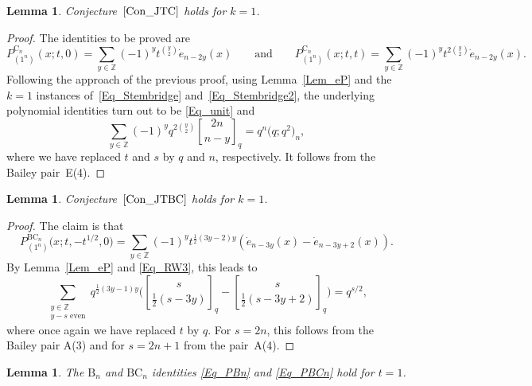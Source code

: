 \documentclass[pdftex]{sigma}
\numberwithin{equation}{section}
\newtheorem{Lemma}[Theorem]{Lemma}
\newcommand{\qbin}[2]{\genfrac{[}{]}{0pt}{}{#1}{#2}}
\begin{document}
\begin{Lemma}\label{Lem_kis1b}
Conjecture~$\ref{Con_JTC}$ holds for $k=1$.
\end{Lemma}

\begin{proof}
The identities to be proved are
\[
P_{(1^n)}^{\mathrm{C}_n}(x;t,0)
=\sum_{y\in\mathbb{Z}}(-1)^y t^{\binom{y}{2}}
\dot{e}_{n-2y}(x)
\qquad\text{and}\qquad
P_{(1^n)}^{\mathrm{C}_n}(x;t,t)
=\sum_{y\in\mathbb{Z}}
(-1)^y t^{2\binom{y}{2}} \dot{e}_{n-2y}(x).
\]
Following the approach of the previous proof, using Lemma~\ref{Lem_eP}
and the $k=1$ instances of~\eqref{Eq_Stembridge} and~\eqref{Eq_Stembridge2},
the underlying polynomial identities turn out
to be \eqref{Eq_unit} and
\[
\sum_{y\in\mathbb{Z}}(-1)^y q^{2\binom{y}{2}} \qbin{2n}{n-y}_q
=q^n \bigl(q;q^2\bigr)_n,
\]
where we have replaced $t$ and $s$ by $q$ and $n$, respectively.
It follows from the Bailey pair~E(4).
\end{proof}

\begin{Lemma}\label{Lem_kis1c}
Conjecture~$\ref{Con_JTBC}$ holds for $k=1$.
\end{Lemma}

\begin{proof}
The claim is that
\[
P_{(1^n)}^{\mathrm{BC}_n}\bigl(x;t,-t^{1/2},0\bigr)
=\sum_{y\in\mathbb{Z}}
(-1)^y t^{\frac{1}{2}(3y-2)y}
 (\dot{e}_{n-3y}(x)-\dot{e}_{n-3y+2}(x) ).
\]
By Lemma~\ref{Lem_eP} and \eqref{Eq_RW3},
this leads to
\[
\sum_{\substack{y\in\mathbb{Z}\\[1pt] y-s \text{ even}}}
q^{\frac{1}{2}(3y-1)y} \biggl( \qbin{s}{\frac{1}{2}(s-3y)}_q
-\qbin{s}{\frac{1}{2}(s-3y+2)}_q \biggr)=q^{s/2},
\]
where once again we have replaced $t$ by $q$.
For $s=2n$, this follows from the Bailey pair A(3) and for $s=2n+1$
from the pair~A(4).
\end{proof}


\begin{Lemma}%
The $\mathrm{B}_n$ and $\mathrm{BC}_n$ identities \eqref{Eq_PBn}
and \eqref{Eq_PBCn} hold for $t=1$.
\end{Lemma}
\end{document}
